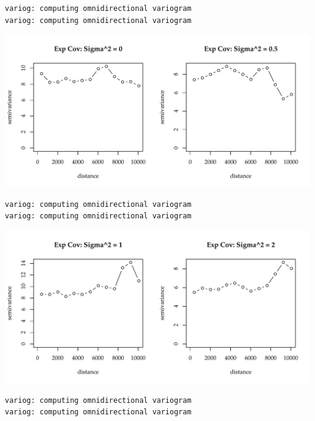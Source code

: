 \documentclass{article}\usepackage[]{graphicx}\usepackage[]{color}
\makeatletter
\def\maxwidth{ %
  \ifdim\Gin@nat@width>\linewidth
    \linewidth
  \else
    \Gin@nat@width
  \fi
}
\newenvironment{kframe}{%
 \def\at@end@of@kframe{}%
 \ifinner\ifhmode%
  \def\at@end@of@kframe{\end{minipage}}%
  \begin{minipage}{\columnwidth}%
 \fi\fi%
 \def\FrameCommand##1{\hskip\@totalleftmargin \hskip-\fboxsep
 \colorbox{shadecolor}{##1}\hskip-\fboxsep
     \hskip-\linewidth \hskip-\@totalleftmargin \hskip\columnwidth}%
 \MakeFramed {\advance\hsize-\width
   \@totalleftmargin\z@ \linewidth\hsize
   \@setminipage}}%
 {\par\unskip\endMakeFramed%
 \at@end@of@kframe}
\newenvironment{knitrout}{}{} %
\makeatother
\begin{document}
\begin{knitrout}
{}


\begin{kframe}\begin{verbatim}
variog: computing omnidirectional variogram
variog: computing omnidirectional variogram
\end{verbatim}
\end{kframe}

{\centering \includegraphics[width=\maxwidth]{figure/sims_se-9} 

}


\begin{kframe}\begin{verbatim}
variog: computing omnidirectional variogram
variog: computing omnidirectional variogram
\end{verbatim}
\end{kframe}

{\centering \includegraphics[width=\maxwidth]{figure/sims_se-10} 

}


\begin{kframe}\begin{verbatim}
variog: computing omnidirectional variogram
variog: computing omnidirectional variogram
\end{verbatim}
\end{kframe}


\end{knitrout}
\end{document}
